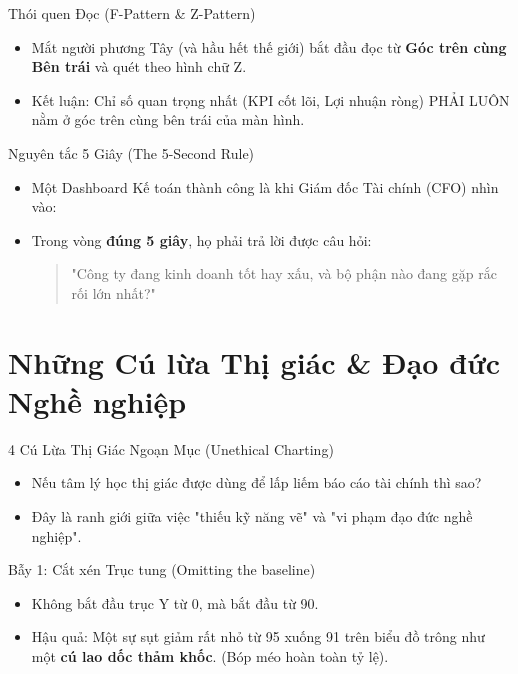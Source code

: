 \documentclass[aspectratio=169,12pt]{beamer}
\begin{document}
\begin{frame}{Thói quen Đọc (F-Pattern \& Z-Pattern)}
    \begin{itemize}
        \item Mắt người phương Tây (và hầu hết thế giới) bắt đầu đọc từ \textbf{Góc trên cùng Bên trái} và quét theo hình chữ Z.
        \item Kết luận: Chỉ số quan trọng nhất (KPI cốt lõi, Lợi nhuận ròng) PHẢI LUÔN nằm ở góc trên cùng bên trái của màn hình.
    \end{itemize}
\end{frame}

\begin{frame}{Nguyên tắc 5 Giây (The 5-Second Rule)}
    \begin{itemize}
        \item Một Dashboard Kế toán thành công là khi Giám đốc Tài chính (CFO) nhìn vào:
        \item Trong vòng \textbf{đúng 5 giây}, họ phải trả lời được câu hỏi:
        \begin{quote}
            "Công ty đang kinh doanh tốt hay xấu, và bộ phận nào đang gặp rắc rối lớn nhất?"
        \end{quote}
    \end{itemize}
\end{frame}


\section{Những Cú lừa Thị giác \& Đạo đức Nghề nghiệp}
\begin{frame}
    \tableofcontents[currentsection]
\end{frame}

\begin{frame}{4 Cú Lừa Thị Giác Ngoạn Mục (Unethical Charting)}
    \begin{itemize}
        \item Nếu tâm lý học thị giác được dùng để lấp liếm báo cáo tài chính thì sao?
        \item Đây là ranh giới giữa việc "thiếu kỹ năng vẽ" và "vi phạm đạo đức nghề nghiệp".
    \end{itemize}
\end{frame}

\begin{frame}{Bẫy 1: Cắt xén Trục tung (Omitting the baseline)}
    \begin{itemize}
        \item Không bắt đầu trục Y từ 0, mà bắt đầu từ 90.
        \item Hậu quả: Một sự sụt giảm rất nhỏ từ 95 xuống 91 trên biểu đồ trông như một \textbf{cú lao dốc thảm khốc}. (Bóp méo hoàn toàn tỷ lệ).
    \end{itemize}
\end{frame}
\end{document}
